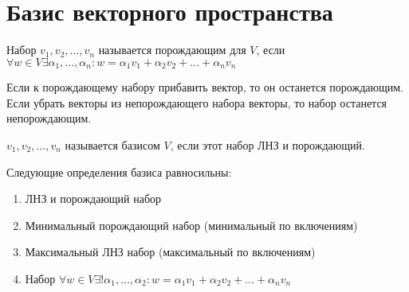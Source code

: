 \documentclass[main]{subfiles}
\begin{document}
\chapter[Базис \texorpdfstring{$V$}{V}]{Базис векторного пространства}
\begin{definition}
    Набор $v_1, v_2, ..., v_n$ называется порождающим для $V$,
    если $\forall w \in V \exists \alpha_1,..., \alpha_n : w =
        \alpha_1 v_1 + \alpha_2 v_2 + ... + \alpha_n v_n$
\end{definition}
\begin{prop}
    Если к порождающему набору прибавить вектор, то он останется порождающим.
    Если убрать векторы из непорождающего набора векторы, то набор останется непорождающим.
\end{prop}

\begin{definition}
    $v_1, v_2, ..., v_n$ называется базисом $V$, если этот набор ЛНЗ и порождающий.
\end{definition}
\begin{theorem}[О базисе]
    Следующие определения базиса равносильны:
    \begin{enumerate}
        \item ЛНЗ и  порождающий набор
        \item Минимальный порождающий набор (минимальный по включениям)
        \item Максимальный ЛНЗ набор (максимальный по включениям)
        \item Набор $\forall w \in V \exists! \alpha_1, ..., \alpha_2:
                  w = \alpha_1 v_1 + \alpha_2 v_2 + ... + \alpha_n v_n$
    \end{enumerate}
\end{theorem}
\end{document}
